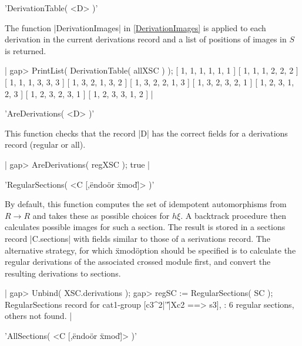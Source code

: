 %

'DerivationTable( <D> )'

The function  |DerivationImages|  in \ref{DerivationImages} is applied
to  each derivation in  the current derivations  record and  a list of
positions of images in $S$ is returned.

|    gap> PrintList( DerivationTable( allXSC ) );
    [ 1, 1, 1, 1, 1, 1 ]
    [ 1, 1, 1, 2, 2, 2 ]
    [ 1, 1, 1, 3, 3, 3 ]
    [ 1, 3, 2, 1, 3, 2 ]
    [ 1, 3, 2, 2, 1, 3 ]
    [ 1, 3, 2, 3, 2, 1 ]
    [ 1, 2, 3, 1, 2, 3 ]
    [ 1, 2, 3, 2, 3, 1 ]
    [ 1, 2, 3, 3, 1, 2 ]  |

%

'AreDerivations( <D> )'

This function checks that the record |D| has  the correct fields for a
derivations record (regular or all).

|    gap> AreDerivations( regXSC );
    true |

%

'RegularSections( <C [,\"endo\" {\rm or} \"xmod\"]> )'

By default, this function computes the set of idempotent automorphisms
from $R \to  R$  and takes these as  possible  choices for $h\xi$.   A
backtrack procedure  then  calculates   possible images for    such  a
section.  The result is stored in  a sections record |C.sections| with
fields  similar  to those of   a serivations  record.  The alternative
strategy,    for  which \"xmod\"   option should   be  specified is to
calculate the regular derivations   of the associated  crossed  module
first, and convert the resulting derivations to sections.

|    gap> Unbind( XSC.derivations );
    gap> regSC := RegularSections( SC );
    RegularSections record for cat1-group [c3^2|'\|'|Xc2 ==> s3],
    : 6 regular sections, others not found.  |

%

'AllSections( <C [,\"endo\" {\rm or} \"xmod\"]> )'

